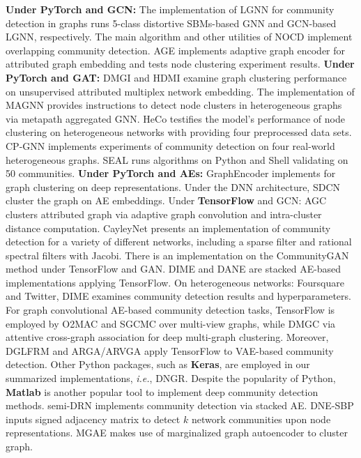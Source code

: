 \label{sec-appcode}
\textbf{Under PyTorch and GCN:} The implementation of LGNN for community detection in graphs runs 5-class distortive SBMs-based GNN and GCN-based LGNN, respectively. The main algorithm and other utilities of NOCD implement overlapping community detection. AGE implements adaptive graph encoder for attributed graph embedding and tests node clustering experiment results. \textbf{Under PyTorch and GAT:} DMGI and HDMI examine graph clustering performance on unsupervised attributed multiplex network embedding. The implementation of MAGNN provides instructions to detect node clusters in heterogeneous graphs via metapath aggregated GNN. HeCo testifies the model's performance of node clustering on heterogeneous networks with providing four preprocessed data sets. CP-GNN implements experiments of community detection on four real-world heterogeneous graphs. SEAL  runs algorithms on Python and Shell validating on 50 communities. \textbf{Under PyTorch and AEs:}  GraphEncoder implements for graph clustering on deep representations. Under the DNN architecture, SDCN cluster the graph on AE embeddings.
Under \textbf{TensorFlow} and GCN:  AGC clusters attributed graph via adaptive graph convolution and intra-cluster distance computation. CayleyNet presents an implementation of community detection for a variety of different networks, including a sparse filter and rational spectral filters with Jacobi. There is an implementation on the CommunityGAN  method under TensorFlow and GAN. DIME and DANE are stacked AE-based implementations applying TensorFlow. On heterogeneous networks: Foursquare and Twitter, DIME examines community detection results and hyperparameters. For graph convolutional AE-based community detection tasks, TensorFlow is employed by O2MAC and SGCMC over multi-view graphs, while DMGC via attentive cross-graph association for deep multi-graph clustering. Moreover, DGLFRM and ARGA/ARVGA apply TensorFlow to VAE-based community detection. Other Python packages, such as \textbf{Keras}, are employed in our summarized implementations, \textit{i.e.}, DNGR.
Despite the popularity of Python, \textbf{Matlab} is another popular tool to implement deep community detection methods. semi-DRN implements community detection via stacked AE. DNE-SBP  inputs signed adjacency matrix to detect $k$ network communities upon node representations. MGAE makes use of marginalized graph autoencoder to cluster graph.
\clearpage
\onecolumn

